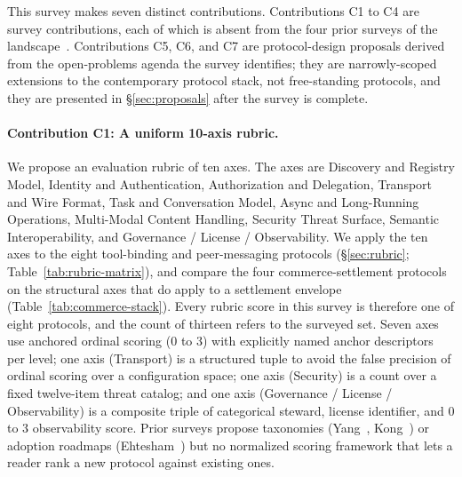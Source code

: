 This survey makes seven distinct contributions.
Contributions C1 to C4 are survey contributions, each of
which is absent from the four prior surveys of the
landscape~\cite{yang2025survey, ehtesham2025interop,
kong2025communication, commcentric2025survey}.
Contributions C5, C6, and C7 are protocol-design
proposals derived from the open-problems agenda the
survey identifies; they are narrowly-scoped extensions
to the contemporary protocol stack, not free-standing
protocols, and they are presented in
\S\ref{sec:proposals} after the survey is complete.

\paragraph{Contribution C1: A uniform 10-axis rubric.}
We propose an evaluation rubric of ten axes. The axes are Discovery
and Registry
Model, Identity and Authentication, Authorization and Delegation,
Transport and Wire Format, Task and Conversation Model, Async and
Long-Running Operations, Multi-Modal Content Handling, Security
Threat Surface, Semantic Interoperability, and Governance / License /
Observability. We apply the ten axes to the eight tool-binding and
peer-messaging protocols (\S\ref{sec:rubric};
Table~\ref{tab:rubric-matrix}), and compare the four
commerce-settlement protocols on the structural axes that do apply to a
settlement envelope (Table~\ref{tab:commerce-stack}). Every rubric score
in this survey is therefore one of eight protocols, and the count of
thirteen refers to the surveyed set. Seven axes use
anchored ordinal scoring (0 to 3) with explicitly named anchor
descriptors per level; one axis (Transport) is a structured
tuple to avoid the false precision of ordinal scoring over a
configuration space; one axis (Security) is a count over a fixed
twelve-item threat catalog; and one axis (Governance / License /
Observability) is a composite triple of categorical steward,
license identifier, and 0 to 3 observability score. Prior surveys propose taxonomies
(Yang~\cite{yang2025survey}, Kong~\cite{kong2025communication}) or
adoption roadmaps (Ehtesham~\cite{ehtesham2025interop}) but no
normalized scoring framework that lets a reader rank a new protocol
against existing ones.

